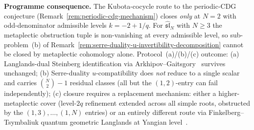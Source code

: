 \begin{proposition}
\medskip
\noindent\textbf{Programme consequence.}
The Kubota-cocycle route to the periodic-CDG conjecture (Remark~\ref{rem:periodic-cdg-mechanism}) closes
\emph{only} at $N=2$ with odd-denominator admissible levels
$k=-2+1/q$. For $\widehat{\mathfrak{sl}}_N$ with $N\geq 3$ the
metaplectic obstruction tuple is non-vanishing at every admissible
level, so sub-problem~(b) of
Remark~\ref{rem:serre-duality-u-invertibility-decomposition} cannot
be closed by metaplectic cohomology alone. Protocol~(a)/(b)/(c)
outcome: (a) Langlands-dual Steinberg identification via
Arkhipov--Gaitsgory~\cite{ArkhipovGaitsgory09} survives unchanged;
(b) Serre-duality $u$-compatibility does \emph{not} reduce to a
single scalar and carries $\binom{N}{2}-1$ residual classes (all
but the $(1,2)$-entry can fail independently); (c) closure
requires a replacement mechanism: either a higher-metaplectic
cover (level-$2q$ refinement extended across all simple roots,
obstructed by the $(1,3),\ldots,(1,N)$ entries) or an entirely
different route via Finkelberg--Tsymbaliuk quantum geometric
Langlands at Yangian level~\cite{FinkelbergTsymbaliuk19}.
\end{proposition}

